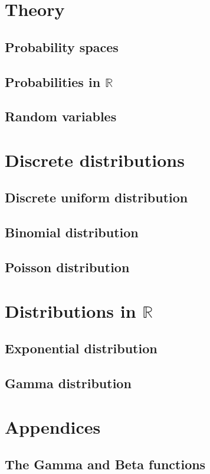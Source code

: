 \documentclass[12pt]{book}
\theoremstyle{plain}
\theoremstyle{definition}
\theoremstyle{remark}
\newcommand{\R}{\mathbb{R}} %
\begin{document}
	\tableofcontents
	
	\part{Theory}

	\chapter{Probability spaces}
	

	\chapter{Probabilities in \texorpdfstring{$\R$}{R}}
	
	
	\chapter{Random variables}
	
	
	\part{Discrete distributions}

	\chapter{Discrete uniform distribution}
	
	
	\chapter{Binomial distribution}
	

	\chapter{Poisson distribution}
	

	\part{Distributions in \texorpdfstring{$\R$}{R}}

	\chapter{Exponential distribution}
	

	\chapter{Gamma distribution}
	

	\part{Appendices}

	\appendix
	\chapter{The Gamma and Beta functions}
	
	
	\printbibliography
\end{document}
